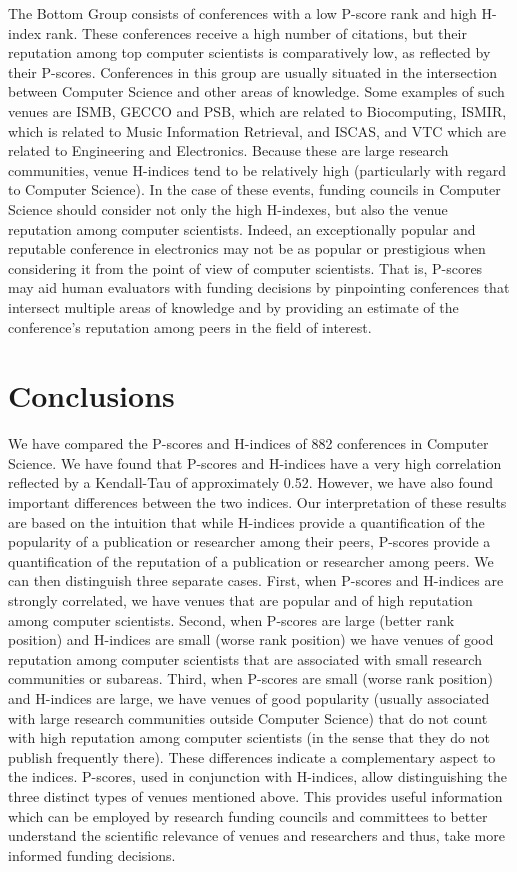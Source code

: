 \documentclass[notitlepage]{svjour3}
\begin{document}
The Bottom Group consists of conferences with a low P-score rank and high H-index rank. These conferences
receive a high number of citations, but their reputation among top computer scientists is comparatively low, as reflected by their P-scores. Conferences in this
group are usually situated in the intersection between Computer Science and other areas of knowledge. Some examples of such venues are
ISMB, GECCO and PSB, which are related to Biocomputing, ISMIR, which is related to Music Information Retrieval, and
ISCAS, and VTC which are related to Engineering and Electronics. Because these are large research communities, venue H-indices tend to be 
relatively high (particularly with regard to Computer Science). In the case of these events, funding councils in Computer Science should consider not only the high H-indexes, but also the venue reputation among computer
scientists. Indeed, an exceptionally popular and reputable conference in electronics may not be as 
popular or prestigious when considering it from the point of view of computer scientists. That is, P-scores may aid 
human evaluators with funding decisions by pinpointing conferences that intersect multiple areas of knowledge and by providing
an estimate of the conference's reputation among peers in the field of interest.


\section{Conclusions}
\label{sec:conclusions}

We have compared the P-scores and H-indices of 882 conferences in Computer Science. 
We have found that P-scores and H-indices have a very high correlation reflected by a Kendall-Tau of 
approximately 0.52. However,
we have also found important differences between the two indices.
Our interpretation of these results are based on the intuition that while H-indices provide a quantification of the popularity of a publication or researcher among their peers, P-scores provide a quantification of the reputation of a publication or researcher among peers. We can then distinguish three separate cases. First, when P-scores and H-indices are strongly correlated, we have venues that are popular and of high reputation among computer scientists. Second, when P-scores are large (better rank position) and H-indices are small (worse rank position) we have venues of good reputation among computer scientists that are associated with small research communities or subareas. Third, when P-scores are small (worse rank position) and H-indices are large, we have venues of good popularity (usually associated with large research communities outside Computer Science) that do not count with high reputation among computer scientists (in the sense that they do not publish frequently there).
These differences indicate a complementary aspect to the indices. P-scores, used in conjunction with H-indices, allow distinguishing the three distinct types of venues mentioned above. This provides useful information which
can be employed
by research funding councils and committees to better understand 
the scientific relevance of venues and researchers and thus, take more informed funding decisions.

% 

% 

\end{document}
